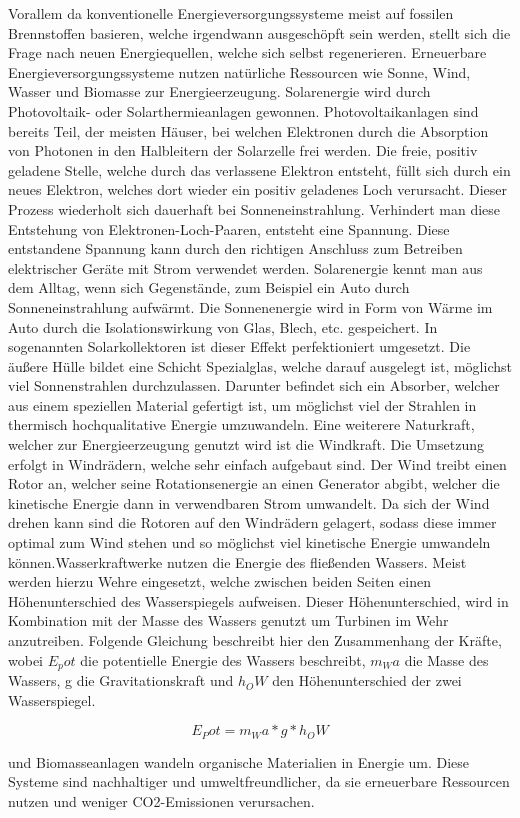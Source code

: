 Vorallem da konventionelle Energieversorgungssysteme meist auf fossilen
Brennstoffen basieren, welche irgendwann ausgeschöpft sein werden, stellt sich
die Frage nach neuen Energiequellen, welche sich selbst regenerieren.
Erneuerbare Energieversorgungssysteme nutzen natürliche Ressourcen wie Sonne,
Wind, Wasser und Biomasse zur Energieerzeugung. Solarenergie wird durch
Photovoltaik- oder Solarthermieanlagen gewonnen. Photovoltaikanlagen sind
bereits Teil, der meisten Häuser, bei welchen Elektronen durch die Absorption
von Photonen in den Halbleitern der Solarzelle frei werden. Die freie, positiv
geladene Stelle, welche durch das verlassene Elektron entsteht, füllt sich
durch ein neues Elektron, welches dort wieder ein positiv geladenes Loch
verursacht. Dieser Prozess wiederholt sich dauerhaft bei Sonneneinstrahlung.
Verhindert man diese Entstehung von Elektronen-Loch-Paaren, entsteht eine
Spannung. Diese entstandene Spannung kann durch den richtigen Anschluss zum
Betreiben elektrischer Geräte mit Strom verwendet
werden.\cite{renner2010grundlagen} Solarenergie kennt man aus dem Alltag, wenn
sich Gegenstände, zum Beispiel ein Auto durch Sonneneinstrahlung aufwärmt. Die
Sonnenenergie wird in Form von Wärme im Auto durch die Isolationswirkung von
Glas, Blech, etc. gespeichert. In sogenannten Solarkollektoren ist dieser
Effekt perfektioniert umgesetzt. Die äußere Hülle bildet eine Schicht
Spezialglas, welche darauf ausgelegt ist, möglichst viel Sonnenstrahlen
durchzulassen. Darunter befindet sich ein Absorber, welcher aus einem
speziellen Material gefertigt ist, um möglichst viel der Strahlen in thermisch
hochqualitative Energie umzuwandeln.\cite{schabbach2014solarthermie} Eine
weiterere Naturkraft, welcher zur Energieerzeugung genutzt wird ist die
Windkraft. Die Umsetzung erfolgt in Windrädern, welche sehr einfach aufgebaut
sind. Der Wind treibt einen Rotor an, welcher seine Rotationsenergie an einen
Generator abgibt, welcher die kinetische Energie dann in verwendbaren Strom
umwandelt. Da sich der Wind drehen kann sind die Rotoren auf den Windrädern
gelagert, sodass diese immer optimal zum Wind stehen und so möglichst viel
kinetische Energie umwandeln
können.\cite{osterhage2015windkraft}Wasserkraftwerke nutzen die Energie des
fließenden Wassers. Meist werden hierzu Wehre eingesetzt, welche zwischen
beiden Seiten einen Höhenunterschied des Wasserspiegels aufweisen. Dieser
Höhenunterschied, wird in Kombination mit der Masse des Wassers genutzt um
Turbinen im Wehr anzutreiben. Folgende Gleichung beschreibt hier den Zusammenhang der Kräfte, wobei $E_pot$ die potentielle Energie des Wassers beschreibt, $m_Wa$ die Masse des Wassers, g die Gravitationskraft und $h_OW$ den Höhenunterschied der zwei Wasserspiegel.

\begin{equation*}
    E_Pot = m_Wa * g * h_OW
\end{equation*}
\cite{madhulatha2012overview}

und Biomasseanlagen wandeln organische
Materialien in Energie um. Diese Systeme sind nachhaltiger und
umweltfreundlicher, da sie erneuerbare Ressourcen nutzen und weniger
CO2-Emissionen verursachen.